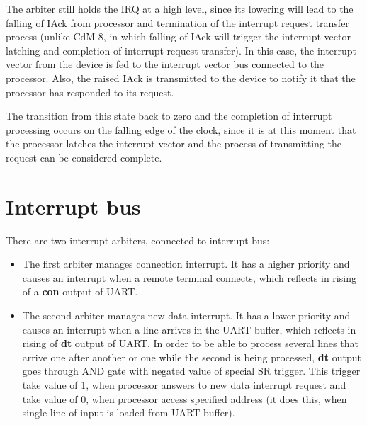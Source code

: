 \begin{enumerate}
		The arbiter still holds the IRQ at a high level, since its lowering will lead to the falling of IAck from processor and termination of the interrupt request transfer process (unlike CdM-8, in which falling of IAck will trigger the interrupt vector latching and completion of interrupt request transfer). In this case, the interrupt vector from the device is fed to the interrupt vector bus connected to the processor. Also, the raised IAck is transmitted to the device to notify it that the processor has responded to its request.

		The transition from this state back to zero and the completion of interrupt processing occurs on the falling edge of the clock, since it is at this moment that the processor latches the interrupt vector and the process of transmitting the request can be considered complete.
\end{enumerate}

\section*{Interrupt bus}

There are two interrupt arbiters, connected to interrupt bus:

\begin{itemize}
	\item The first arbiter manages connection interrupt. It has a higher priority and causes an interrupt when a remote terminal connects, which reflects in rising of a \textbf{con} output of UART.
	\item The second arbiter manages new data interrupt. It has a lower priority and causes an interrupt when a line arrives in the UART buffer, which reflects in rising of \textbf{dt} output of UART. In order to be able to process several lines that arrive one after another or one while the second is being processed, \textbf{dt} output goes through AND gate with negated value of special SR trigger. This trigger take value of 1, when processor answers to new data interrupt request and take value of 0, when processor access specified address (it does this, when single line of input is loaded from UART buffer).
\end{itemize}

